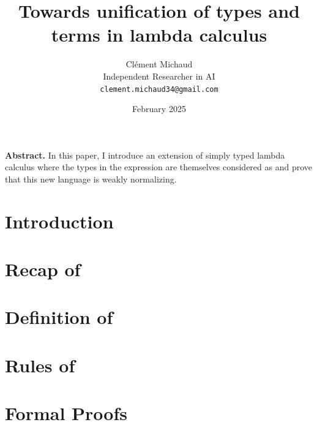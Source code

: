\documentclass{article}
\title{Towards unification of types and\\terms in lambda calculus}
\author{
    Clément Michaud \\  
    \small Independent Researcher in AI\\ 
    \small \texttt{clement.michaud34@gmail.com}
}
\date{February 2025}
\begin{document}
\maketitle

\begin{center}
    \begin{minipage}{0.9\textwidth}
        \small
        \textbf{Abstract.} In this paper, I introduce an extension of simply typed lambda calculus where the types in the expression are themselves considered as \lambdaterms and prove that this new language is weakly normalizing.
    \end{minipage}
\end{center}

\vspace{10pt}

\section{Introduction}



\section{Recap of \lambdacalc}



\section{Definition of \safelambdatau}



\section{Rules of \safelambdatau}



\section{Formal Proofs}



\clearpage



\clearpage


\end{document}
